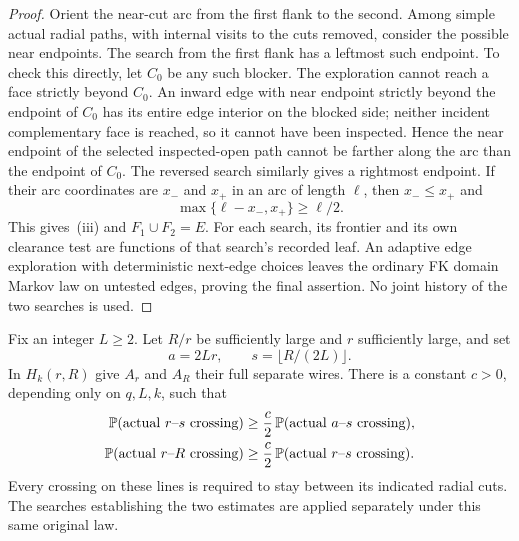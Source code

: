 \begin{proof}
Orient the near-cut arc from the first flank to the second.  Among
simple actual radial paths, with internal visits to the cuts removed,
consider the possible near endpoints.  The search from the first
flank has a leftmost such endpoint.  To check this directly, let $C_0$
be any such blocker.  The exploration cannot reach a face strictly
beyond $C_0$.  An inward edge with near endpoint strictly beyond the
endpoint of $C_0$ has its entire edge interior on the blocked side;
neither incident complementary face is reached, so it cannot have
been inspected.  Hence the near endpoint of the selected
inspected-open path cannot be farther along the arc than the
endpoint of $C_0$.  The reversed search similarly gives
a rightmost endpoint.  If their arc coordinates are $x_-$ and $x_+$
in an arc of length $\ell$, then $x_-\le x_+$ and
\[
 \max\{\ell-x_-,x_+\}\ge\ell/2.
\]
This gives~\textup{(iii)} and $F_1\cup F_2=E$.  For each search, its
frontier and its own clearance test are functions of that search's
recorded leaf.  An adaptive edge exploration with deterministic
next-edge choices leaves the ordinary FK domain Markov law on untested
edges, proving the final assertion.  No joint history of the two
searches is used.
\end{proof}

\begin{lemma}
\label{sector:end-extension}
Fix an integer $L\ge2$.  Let $R/r$ be sufficiently large and $r$
sufficiently large, and set
\[
 a=2Lr,\qquad s=\lfloor R/(2L)\rfloor.
\]
In $H_k(r,R)$ give $A_r$ and $A_R$ their full separate wires.  There
is a constant $c>0$, depending only on $q,L,k$, such that
\begin{align}
\label{sector:inner-extension}
 \mathbb P(\text{actual $r$--$s$ crossing})
 &\ge \frac c2\,
      \mathbb P(\text{actual $a$--$s$ crossing}),\\
\label{sector:outer-extension}
 \mathbb P(\text{actual $r$--$R$ crossing})
 &\ge \frac c2\,
      \mathbb P(\text{actual $r$--$s$ crossing}).
\end{align}
Every crossing on these lines is required to stay between its
indicated radial cuts.  The searches establishing the two estimates
are applied separately under this same original law.
\end{lemma}

